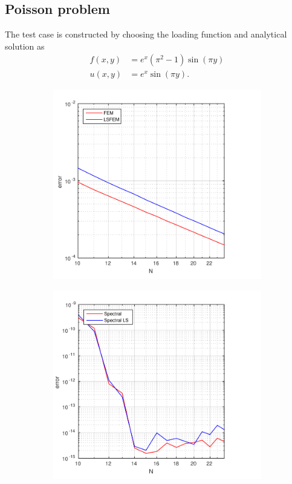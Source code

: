 \subsection{Poisson problem}
The test case is constructed by choosing the loading function and analytical solution as 
\begin{align}
	f(x,y) &=  e^{x}(\pi^2-1)\sin(\pi y)\\
	u(x,y) &=  e^{x}\sin(\pi y). %
	\label{eq:poissonTestCasevariables}
\end{align}
%
\begin{figure}[t]
  \centering
  \begin{subfigure}[b]{0.48\textwidth}
	\includegraphics[width=\textwidth]{Figures/errorFEM-LSFEM.pdf}
  \end{subfigure}%
  \quad
  \begin{subfigure}[b]{0.48\textwidth}
	\includegraphics[width=\textwidth]{Figures/errorSpec-SpecLS.pdf}

\end{subfigure}
\end{figure}
